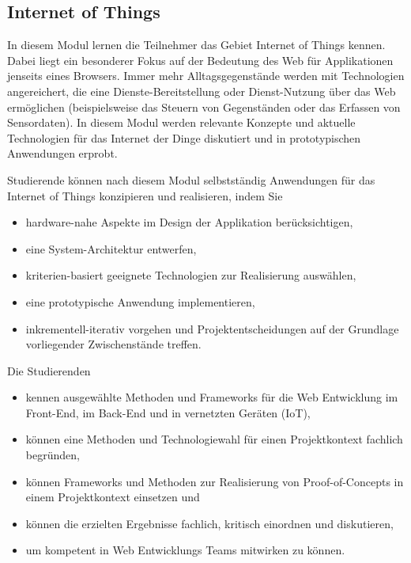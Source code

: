 \subsection*{Internet of
Things\label{/mi-2017/modulbeschreibungen-bachelor/BA_Vertiefung-Web_Development}}\label{internet-of-thingspathlabelmi-2017modulbeschreibungen-bachelorbaux5fvertiefung-webux5fdevelopment-1}

In diesem Modul lernen die Teilnehmer das Gebiet Internet of Things
kennen. Dabei liegt ein besonderer Fokus auf der Bedeutung des Web für
Applikationen jenseits eines Browsers. Immer mehr Alltagsgegenstände
werden mit Technologien angereichert, die eine Dienste-Bereitstellung
oder Dienst-Nutzung über das Web ermöglichen (beispielsweise das Steuern
von Gegenständen oder das Erfassen von Sensordaten). In diesem Modul
werden relevante Konzepte und aktuelle Technologien für das Internet der
Dinge diskutiert und in prototypischen Anwendungen erprobt.

Studierende können nach diesem Modul selbstständig Anwendungen für das
Internet of Things konzipieren und realisieren, indem Sie

\begin{itemize}
\tightlist
\item
  hardware-nahe Aspekte im Design der Applikation berücksichtigen,
\item
  eine System-Architektur entwerfen,
\item
  kriterien-basiert geeignete Technologien zur Realisierung auswählen,
\item
  eine prototypische Anwendung implementieren,
\item
  inkrementell-iterativ vorgehen und Projektentscheidungen auf der
  Grundlage vorliegender Zwischenstände treffen.
\end{itemize}

Die Studierenden

\begin{itemize}
\tightlist
\item
  kennen ausgewählte Methoden und Frameworks für die Web Entwicklung im
  Front-End, im Back-End und in vernetzten Geräten (IoT),
\item
  können eine Methoden und Technologiewahl für einen Projektkontext
  fachlich begründen,
\item
  können Frameworks und Methoden zur Realisierung von Proof-of-Concepts
  in einem Projektkontext einsetzen und
\item
  können die erzielten Ergebnisse fachlich, kritisch einordnen und
  diskutieren,
\item
  um kompetent in Web Entwicklungs Teams mitwirken zu können.
\end{itemize}

